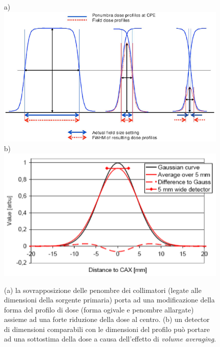 \begin{figure}
\centering
a)\includegraphics[width=.7\textwidth]{./cap2/small_eff1.png}\\
b)\includegraphics[width=.7\textwidth]{./cap2/small_eff2.png}
\caption{(a) la sovrapposizione delle penombre dei collimatori (legate alle dimensioni della sorgente primaria) porta ad una modificazione della forma del profilo di dose (forma ogivale e penombre allargate) assieme ad una forte riduzione della dose al centro. (b) un detector di dimensioni comparabili con le dimensioni del profilo può portare ad una sottostima della dose a causa dell'effetto di \textit{volume averaging}.}
\label{fig:small_eff}
\end{figure}


